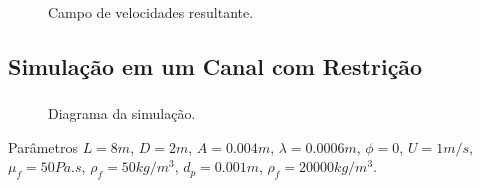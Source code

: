 \documentclass{beamer}
\begin{document}
\begin{frame}
  \frametitle{\subsecname}
  \begin{figure}
     {\raggedleft \tiny Campo de velocidades resultante.}
  \end{figure}
\end{frame}

\subsection*{Simulação em um Canal com Restrição}
\begin{frame}
  \frametitle{\subsecname}
  
  \begin{figure}
     {\raggedleft \tiny Diagrama da simulação.}
  \end{figure}
  \begin{block}{Parâmetros}
    $L=8m$, $D=2m$, $A=0.004m$, $\lambda=0.0006m$, $\phi=0$, $U=1m/s$, $\mu_f=50Pa.s$, $\rho_f=50kg/m^3$, $d_p=0.001m$, $\rho_f=20000kg/m^3$.
  \end{block}
\end{frame}
\end{document}
